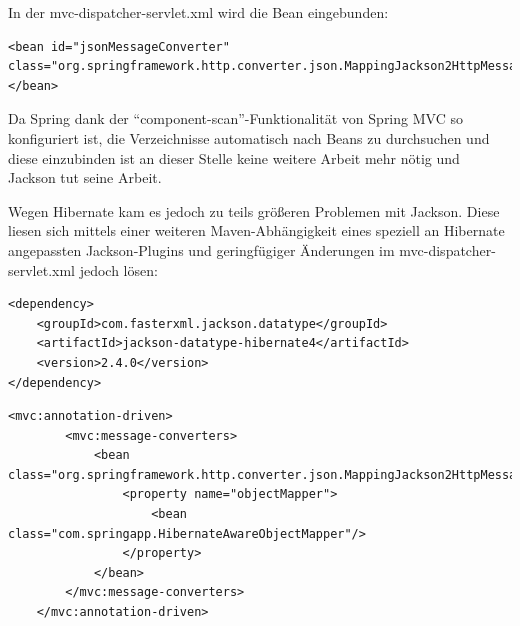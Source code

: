 In der mvc-dispatcher-servlet.xml wird die Bean eingebunden:
\lstset{language=xml}
\begin{lstlisting}[frame=htrbl, caption={Ausschnitt aus mvc-dispatcher-servlet.xml}, breaklines=true]
<bean id="jsonMessageConverter" class="org.springframework.http.converter.json.MappingJackson2HttpMessageConverter">
</bean>
\end{lstlisting}

Da Spring dank der ``component-scan''-Funktionalität von Spring MVC so konfiguriert ist, die Verzeichnisse automatisch nach Beans zu durchsuchen und diese einzubinden ist an dieser Stelle keine weitere Arbeit mehr nötig und Jackson tut seine Arbeit.

Wegen Hibernate kam es jedoch zu teils größeren Problemen mit Jackson. Diese liesen sich mittels einer weiteren Maven-Abhängigkeit eines speziell an Hibernate angepassten Jackson-Plugins und geringfügiger Änderungen im mvc-dispatcher-servlet.xml jedoch lösen:
\lstset{language=xml}
\begin{lstlisting}[frame=htrbl, caption={Ausschnitt aus der pom.xml}, breaklines=true]
<dependency>
	<groupId>com.fasterxml.jackson.datatype</groupId>
	<artifactId>jackson-datatype-hibernate4</artifactId>
	<version>2.4.0</version>
</dependency>
\end{lstlisting}
\lstset{language=xml}
\begin{lstlisting}[frame=htrbl, caption={Ausschnitt aus mvc-dispatcher-servlet.xml}, breaklines=true]
<mvc:annotation-driven>
        <mvc:message-converters>
            <bean class="org.springframework.http.converter.json.MappingJackson2HttpMessageConverter">
                <property name="objectMapper">
                    <bean class="com.springapp.HibernateAwareObjectMapper"/>
                </property>
            </bean>
        </mvc:message-converters>
    </mvc:annotation-driven>
\end{lstlisting}